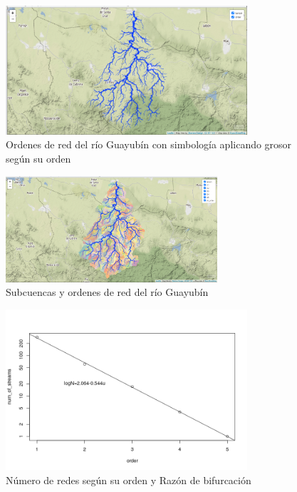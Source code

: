 \documentclass[11pt,]{article}
\begin{document}
\begin{figure}
\centering
\includegraphics[width=0.80000\textwidth]{orden de red mapa 2.png}
\caption{Ordenes de red del río Guayubín con simbología aplicando grosor
según su orden\label{grosor}}
\end{figure}

\begin{figure}
\centering
\includegraphics[width=0.70000\textwidth]{cuencas delimitadas y ordenes de red.png}
\caption{Subcuencas y ordenes de red del río Guayubín\label{subcuencas}}
\end{figure}

\begin{figure}
\centering
\includegraphics[width=0.80000\textwidth]{Numero de red segun su orden.png}
\caption{Número de redes según su orden y Razón de
bifurcación\label{grafnumero}}
\end{figure}
\end{document}
